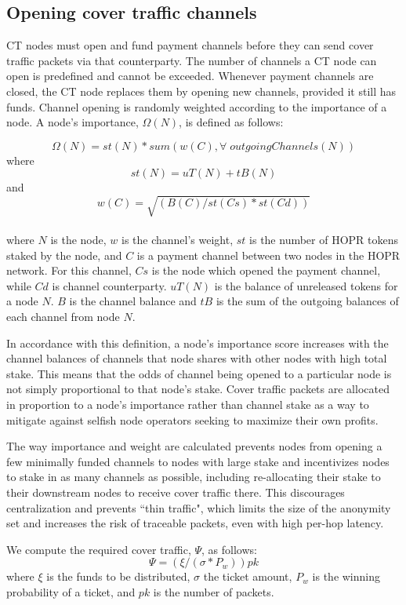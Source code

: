 \subsection{Opening cover traffic channels} 
CT nodes must open and fund payment channels before they can send cover traffic packets via that counterparty. The number of channels a CT node can open is predefined and cannot be exceeded. Whenever payment channels are closed, the CT node replaces them by opening new channels, provided it still has funds. Channel opening is randomly weighted according to the importance of a node. A node's importance, $\Omega(N)$, is defined as follows:

$$\Omega(N) = st(N) * sum(w(C), \forall \; outgoingChannels(N))$$
where 
$$st(N) = uT(N) + tB(N)$$
and 
$$w(C) = \sqrt{(B(C) / st(Cs) * st(Cd))}$$
\\
where $N$ is the node, $w$ is the channel's weight, $st$ is the number of HOPR tokens staked by the node, and $C$ is a payment channel between two nodes in the HOPR network. For this channel, $Cs$ is the node which opened the payment channel, while $Cd$ is channel counterparty. $uT(N)$ is the balance of unreleased tokens for a node $N$. $B$ is the channel balance and $tB$ is the sum of the outgoing balances of each channel from node $N$.

 In accordance with this definition, a node's importance score increases with the channel balances of channels that node shares with other nodes with high total stake. This means that the odds of channel being opened to a particular node is not simply proportional to that node’s stake. Cover traffic packets are allocated in proportion to a node's importance rather than channel stake as a way to mitigate against selfish node operators seeking to maximize their own profits.

The way importance and weight are calculated prevents nodes from opening a few minimally funded channels to nodes with large stake and incentivizes nodes to stake in as many channels as possible,  including re-allocating their stake to their downstream nodes to receive cover traffic there. This discourages centralization and prevents ``thin traffic", which limits the size of the anonymity set and increases the risk of traceable packets, even with high per-hop latency.

 We compute the required cover traffic, $\Psi$, as follows:
$$\Psi= ( \xi/ (\sigma * P_w)) pk$$
where $\xi$ is the funds to be distributed, $\sigma$ the ticket amount, $P_w$ is the winning probability of a ticket, and $pk$ is the number of packets.

